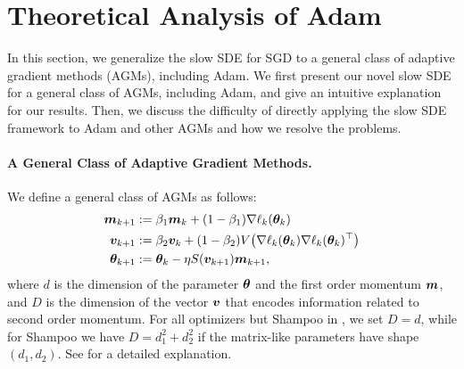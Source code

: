 \section{Theoretical Analysis of Adam}\label{sec:theory}
In this section, we generalize the slow SDE for SGD to a general class of adaptive gradient methods (AGMs), including Adam. We first present our novel slow SDE for a general class of AGMs, including Adam, and give an intuitive explanation for our results. Then, we discuss the difficulty of directly applying the slow SDE framework to Adam and other AGMs and how we resolve the problems. 
\paragraph{A General Class of Adaptive Gradient Methods.}
We define a general class of AGMs as follows:
\begin{align*}
    {\bm{m}}_{k+1} &:= \beta_1 {\bm{m}}_{k} + (1-\beta_1) \nabla \ell_{k}({\bm{\theta}}_{k}) \\
    {\bm{v}}_{k+1} &:= \beta_2 {\bm{v}}_{k} + (1-\beta_2) V\!\left(\nabla\ell_{k}({\bm{\theta}}_{k}) \nabla\ell_{k}({\bm{\theta}}_{k})^\top\right) \\
    {\bm{\theta}}_{k+1} &:= {\bm{\theta}}_{k} - \eta S({\bm{v}}_{k+1}) {\bm{m}}_{k+1},
\end{align*}
where $d$ is the dimension of the parameter ${\bm{\theta}}$ and the first order momentum ${\bm{m}}$, and $D$ is the dimension of the vector ${\bm{v}}$ that encodes information related to second order momentum. For all optimizers but Shampoo in , we set $D = d$, while for Shampoo we have $D = d_1^2 + d_2^2$ if the matrix-like parameters have shape $(d_1, d_2)$. See  for a detailed explanation.

